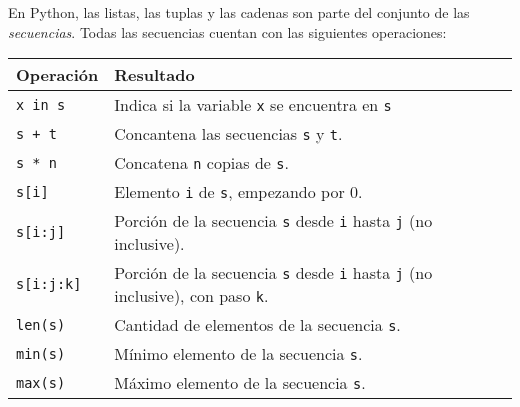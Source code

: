 \begin{sabias_que}
En Python, las listas, las tuplas y las cadenas son parte del conjunto
de las {\it secuencias}.  Todas las secuencias cuentan con las siguientes
operaciones:

\begin{tabular}{l|l}
Operación & Resultado \\
\hline
\lstinline!x in s! & Indica si la variable \lstinline!x! se encuentra en
\lstinline!s! \\
\lstinline!s + t! & Concantena las secuencias \lstinline!s! y \lstinline!t!. \\
\lstinline!s * n! & Concatena \lstinline!n! copias de \lstinline!s!. \\
\lstinline!s[i]! & Elemento \lstinline!i! de \lstinline!s!, empezando por
0. \\
\lstinline!s[i:j]! & Porción de la secuencia \lstinline!s! desde
\lstinline!i! hasta \lstinline!j! (no inclusive). \\
\lstinline!s[i:j:k]! & Porción de la secuencia \lstinline!s! desde 
\lstinline!i! hasta \lstinline!j! (no inclusive), con paso \lstinline!k!.  \\
\lstinline!len(s)! & Cantidad de elementos de la secuencia \lstinline!s!.  \\
\lstinline!min(s)! & Mínimo elemento de la secuencia \lstinline!s!. \\
\lstinline!max(s)! & Máximo elemento de la secuencia \lstinline!s!. \\
\end{tabular}

\end{sabias_que}



